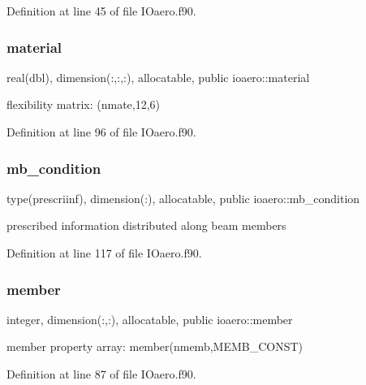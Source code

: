 Definition at line 45 of file I\+Oaero.\+f90.

\mbox{\label{namespaceioaero_a83ca534029c39300d045045432607a69}} 
\subsubsection{\texorpdfstring{material}{material}}
{\footnotesize\ttfamily real(dbl), dimension(\+:,\+:,\+:), allocatable, public ioaero\+::material}



flexibility matrix\+: (nmate,12,6) 



Definition at line 96 of file I\+Oaero.\+f90.

\mbox{\label{namespaceioaero_a2463929ef049b49fe7b49011c66cc806}} 
\subsubsection{\texorpdfstring{mb\+\_\+condition}{mb\_condition}}
{\footnotesize\ttfamily type(prescriinf), dimension(\+:), allocatable, public ioaero\+::mb\+\_\+condition}



prescribed information distributed along beam members 



Definition at line 117 of file I\+Oaero.\+f90.

\mbox{\label{namespaceioaero_ae040b39fe109c45b001985415e230ec3}} 
\subsubsection{\texorpdfstring{member}{member}}
{\footnotesize\ttfamily integer, dimension(\+:,\+:), allocatable, public ioaero\+::member}



member property array\+: member(nmemb,\+M\+E\+M\+B\+\_\+\+C\+O\+N\+S\+T) 



Definition at line 87 of file I\+Oaero.\+f90.

